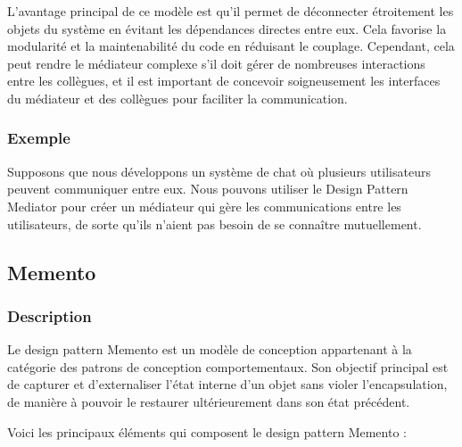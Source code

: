 L'avantage principal de ce modèle est qu'il permet de déconnecter étroitement les objets du système en évitant les dépendances directes entre eux. Cela favorise la modularité et la maintenabilité du code en réduisant le couplage. Cependant, cela peut rendre le médiateur complexe s'il doit gérer de nombreuses interactions entre les collègues, et il est important de concevoir soigneusement les interfaces du médiateur et des collègues pour faciliter la communication.


\subsubsection{Exemple}

Supposons que nous développons un système de chat où plusieurs utilisateurs peuvent communiquer entre eux. Nous pouvons utiliser le Design Pattern Mediator pour créer un médiateur qui gère les communications entre les utilisateurs, de sorte qu'ils n'aient pas besoin de se connaître mutuellement.




\newpage

\subsection{Memento}

\subsubsection{Description}

Le design pattern Memento est un modèle de conception appartenant à la catégorie des patrons de conception comportementaux. Son objectif principal est de capturer et d'externaliser l'état interne d'un objet sans violer l'encapsulation, de manière à pouvoir le restaurer ultérieurement dans son état précédent.

Voici les principaux éléments qui composent le design pattern Memento :

